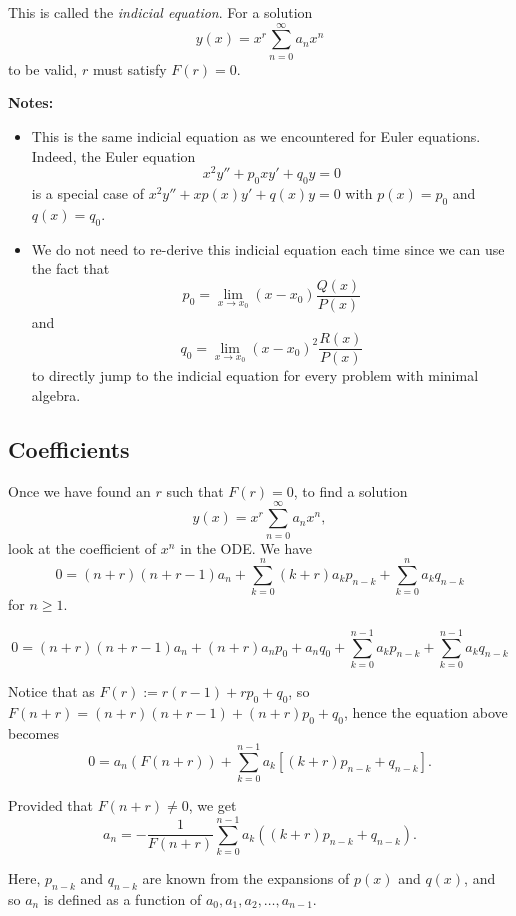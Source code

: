 \documentclass[11pt]{article}
\newcommand{\sumseries}{\sum_{n=0}^{\infty}}
\begin{document}
	This is called the \emph{indicial equation}. For a solution
		$$ y(x) = x^r \sumseries a_n x^n $$
	to be valid, $r$ must satisfy $F(r) = 0$.

	\textbf{Notes:}
		\begin{itemize}
			\item This is the same indicial equation as we encountered for Euler equations. Indeed, the Euler equation
				$$ x^2 y'' + p_0 x y' + q_0 y = 0 $$
			is a special case of $x^2 y'' + x p(x) y' + q(x) y = 0$ with $p(x) = p_0$ and $q(x) = q_0$.
			\item We do not need to re-derive this indicial equation each time since we can use the fact that
				$$ p_0 = \lim_{x \to x_0} (x-x_0) \frac{Q(x)}{P(x)} $$
			and
				$$ q_0 = \lim_{x \to x_0} (x-x_0)^2 \frac{R(x)}{P(x)} $$
			to directly jump to the indicial equation for every problem with minimal algebra.
		\end{itemize}

\subsection{Coefficients}
	Once we have found an $r$ such that $F(r) = 0$, to find a solution
		$$ y(x) = x^r \sumseries a_n x^n ,$$
	look at the coefficient of $x^n$ in the ODE. We have
		$$ 0 = (n+r)(n+r-1) a_n + \sum_{k=0}^n (k+r)a_k p_{n-k} + \sum_{k=0}^n a_k q_{n-k} $$
	for $n \geq 1$.

		$$ 0 = (n+r)(n+r-1) a_n + (n+r) a_n p_0 + a_n q_0 + \sum_{k=0}^{n-1} a_k p_{n-k} + \sum_{k=0}^{n-1} a_k q_{n-k} $$

	Notice that as $F(r) := r (r-1) + r p_0 + q_0$, so $F(n+r) = (n+r) (n+r - 1) + (n+r) p_0 + q_0$, hence the equation above becomes
		$$ 0 = a_n (F(n+r)) + \sum_{k=0}^{n-1} a_k \left[(k+r) p_{n-k} + q_{n-k}\right]. $$

	Provided that $F(n+r) \neq 0$, we get
		$$ \boxed{a_n = - \frac{1}{F(n+r)} \sum_{k=0}^{n-1} a_k ((k+r) p_{n-k} + q_{n-k})} .$$

	Here, $p_{n-k}$ and $q_{n-k}$ are known from the expansions of $p(x)$ and $q(x)$, and so $a_n$ is defined as a function of $a_0, a_1, a_2, \ldots, a_{n-1}$.
\end{document}
